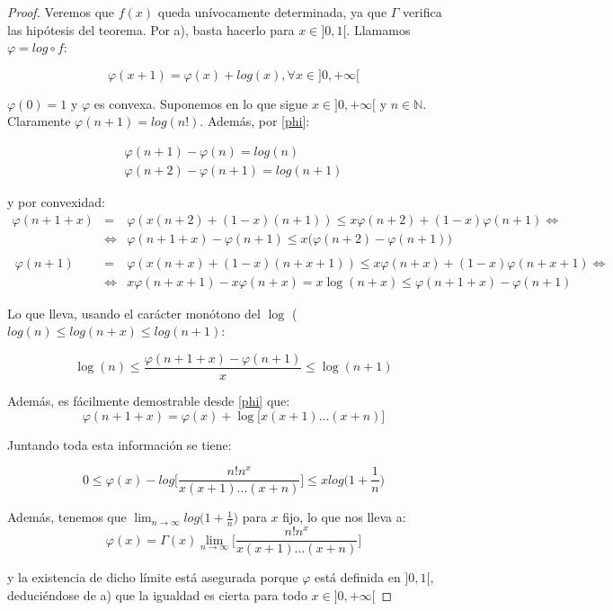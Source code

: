 \documentclass[a4paper, 11pt]{amsart}
\theoremstyle{definition}
\theoremstyle{remark}
\numberwithin{equation}{section}
\begin{document}
  \begin{proof}
   Veremos que $f(x)$ queda unívocamente determinada, ya que $\Gamma$ verifica las hipótesis del teorema.
   Por a), basta hacerlo para $x\in]0,1[$. Llamamos $\varphi = log \circ f$:
   
   \begin{equation}
    \varphi (x+1) = \varphi(x) + log(x), \forall x\in]0,+\infty[
    \label{phi}
   \end{equation}
   
   $\varphi(0) = 1$ y $\varphi$ es convexa. Suponemos en lo que sigue $ x\in]0,+\infty[$ y $n\in \mathbb{N}$.
   Claramente $\varphi(n+1) = log(n!)$. Además, por \ref{phi}:
   
   \begin{eqnarray*}
    \varphi(n+1)-\varphi(n) = log(n)\\
    \varphi(n+2)-\varphi(n+1) = log(n+1)
   \end{eqnarray*}
   
   y por convexidad:
   \begin{eqnarray*}
    \varphi (n+1+x) &=& \varphi(x(n+2) +(1-x)(n+1)) \le x\varphi(n+2) + (1-x)\varphi(n+1) \Leftrightarrow\\
    &\Leftrightarrow& \varphi (n+1+x) - \varphi(n+1) \le x\big(\varphi(n+2)-\varphi(n+1)\big)\\
    \\\
    \varphi(n+1) &=& \varphi(x(n+x)+(1-x)(n+x+1)) \le x\varphi(n+x) + (1-x) \varphi(n+x+1) \Leftrightarrow\\
    &\Leftrightarrow& x\varphi(n+x+1) - x\varphi(n+x) = x\log(n+x) \le \varphi(n+1+x)-\varphi(n+1)
   \end{eqnarray*}
   
   Lo que lleva, usando el carácter monótono del $\log$ ($log(n) \le log(n+x) \le log(n+1)$:
   
   $$\log(n) \le \frac{\varphi(n+1+x)-\varphi(n+1)}{x} \le \log(n+1)$$
   
   Además, es fácilmente demostrable desde \ref{phi} que:
   \begin{equation}
    \varphi(n+1+x) = \varphi(x) + \log\big[x(x+1)\ldots(x+n)\big]
   \end{equation}
   
   Juntando toda esta información se tiene:
   
   $$0\le \varphi(x) - log \bigg[\frac{n!n^x}{x(x+1)\ldots (x+n)}\bigg] \le xlog\bigg(1+\frac{1}{n}\bigg)$$
   
   Además, tenemos que $\lim_{n\rightarrow \infty} log\bigg(1+\frac{1}{n}\bigg)$ para $x$ fijo, lo que nos lleva a:\\
   
   $$\varphi(x) = \Gamma(x) \lim_{n\rightarrow \infty} \bigg[\frac{n!n^x}{x(x+1)\ldots (x+n)}\bigg] $$
   
   y la existencia de dicho límite está asegurada porque $\varphi$ está definida en $]0,1[$, deduciéndose
   de a) que la igualdad es cierta para todo $x\in]0,+\infty[$
  \end{proof}
\end{document}
